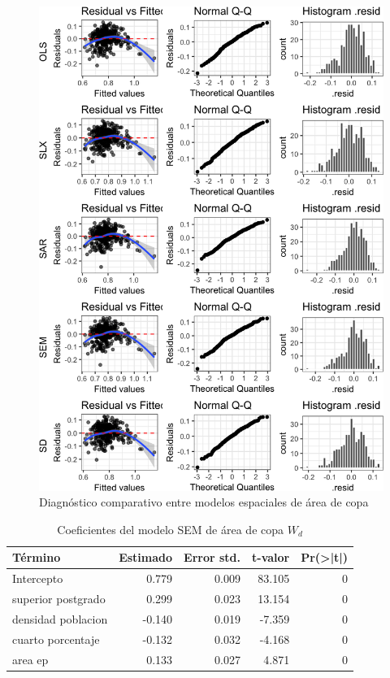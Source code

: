 \documentclass[12pt,a4paper,openany]{book}
\theoremstyle{definition}
\theoremstyle{definition}
\theoremstyle{definition}
\theoremstyle{remark}
\begin{document}
\begin{figure}

{\centering \includegraphics[width=1\linewidth]{tesis-unigis_files/figure-latex/diag-model-espaciales-1} 

}

\caption{Diagnóstico comparativo entre modelos espaciales de área de copa}\label{fig:diag-model-espaciales}
\end{figure}

\begin{table}[t]

\caption{\label{tab:coef-sem-copa-wd}Coeficientes del modelo SEM de área de copa $W_d$}
\centering
\begin{tabular}{lrrrr}
\toprule
Término & Estimado & Error std. & t-valor & Pr(>|t|)\\
\midrule
Intercepto & 0.779 & 0.009 & 83.105 & 0\\
superior postgrado & 0.299 & 0.023 & 13.154 & 0\\
densidad poblacion & -0.140 & 0.019 & -7.359 & 0\\
cuarto porcentaje & -0.132 & 0.032 & -4.168 & 0\\
area ep & 0.133 & 0.027 & 4.871 & 0\\
\bottomrule
\end{tabular}
\end{table}
\end{document}
